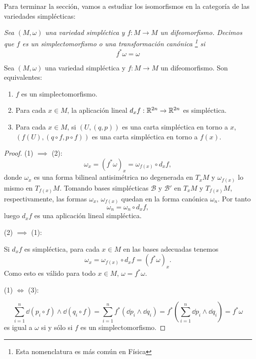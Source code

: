 Para terminar la sección, vamos a estudiar los isomorfismos en la categoría de las variedades simplécticas:
\begin{defn}[Simplectomorfismo]
  \em
  Sea $(M,\omega)$ una variedad simpléctica y $f:M \rightarrow M$ un difeomorfismo. Decimos que $f$ es un \emph{simplectomorfismo} o una \emph{transformación canónica} \footnote{Esta nomenclatura es más común en Física} si
  \begin{equation*}
    f^* \omega = \omega
  \end{equation*}
\end{defn}
\begin{prop}
  Sea $(M,\omega)$ una variedad simpléctica y $f:M \rightarrow M$ un difeomorfismo. Son equivalentes:
  \begin{enumerate}
    \item $f$ es un simplectomorfismo.
    \item Para cada $x\in M$, la aplicación lineal $d_xf: \mathbb{R}^{2n} \rightarrow \mathbb{R}^{2n}$ es simpléctica.
    \item Para cada $x \in M$, si $(U,(q,p))$ es una carta simpléctica en torno a $x$, $(f(U),(q\circ f, p \circ f))$ es una carta simpléctica en torno a $f(x)$.
  \end{enumerate}
\end{prop}
\begin{proof}\leavevmode
  
  (1) $\implies$ (2):
  \begin{equation*}
    \omega_x=(f^*\omega)_x=\omega_{f(x)} \circ d_x f,
  \end{equation*}
  donde $\omega_x$ es una forma bilineal antisimétrica no degenerada en $T_xM$ y $\omega_{f(x)}$ lo mismo en $T_{f(x)}M$. Tomando bases simplécticas $\mathcal{B}$ y $\mathcal{B'}$ en $T_xM$ y $T_{f(x)}M$, respectivamente, las formas $\omega_x$, $\omega_{f(x)}$ quedan en la forma canónica $\omega_n$. Por tanto
  \begin{equation*}
   \omega_n = \omega_n \circ d_x f, 
  \end{equation*}
  luego $d_x f$ es una aplicación lineal simpléctica.

  (2) $\implies$ (1):

  Si $d_x f$ es simpléctica, para cada $x \in M$ en las bases adecuadas tenemos
  \begin{equation*}
    \omega_x=\omega_{f(x)} \circ d_x f=(f^*\omega)_x. 
  \end{equation*}
Como esto es válido para todo $x \in M$, $\omega=f^* \omega$.

(1) $\Longleftrightarrow$ (3):

\begin{equation*}
  \sum_{i=1}^n \dd (p_i \circ f) \wedge \dd (q_i \circ f) = \sum_{i=1}^n f^* (\dd p_i \wedge \dd q_i) = f^* \left( \sum_{i=1}^n \dd p_i \wedge \dd q_i \right) = f^* \omega
\end{equation*}
es igual a $\omega$ si y sólo si $f$ es un simplectomorfismo.

\end{proof}

